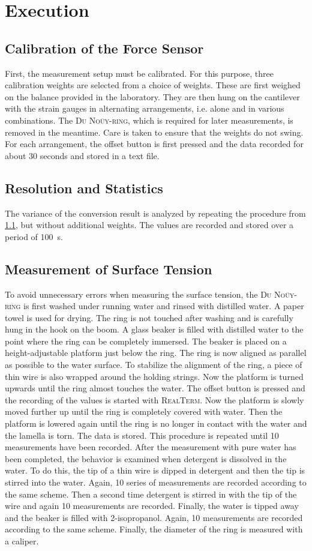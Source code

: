 \chapter{Execution}
\section{Calibration of the Force Sensor} \label{sec:Calibration}
First, the measurement setup must be calibrated. For this purpose, three calibration weights are selected from a choice of weights. These are first weighed on the balance provided in the laboratory. They are then hung on the cantilever with the strain gauges in alternating arrangements, i.e. alone and in various combinations. The \textsc{Du Noüy-ring}, which is required for later measurements, is removed in the meantime. Care is taken to ensure that the weights do not swing. For each arrangement, the offset button is first pressed and the data recorded for about 30 seconds and stored in a text file.
%
\section{Resolution and Statistics} \label{sec:Statistics}
The variance of the conversion result is analyzed by repeating the procedure from \cref{sec:Calibration}, but without additional weights. The values are recorded and stored over a period of \SI{100}{s}.
%
\section{Measurement of Surface Tension} \label{sec:Surface_Tension}
To avoid unnecessary errors when measuring the surface tension, the \textsc{Du Noüy-ring} is first washed under running water and rinsed with distilled water. A paper towel is used for drying. The ring is not touched after washing and is carefully hung in the hook on the boom. A glass beaker is filled with distilled water to the point where the ring can be completely immersed. The beaker is placed on a height-adjustable platform just below the ring. The ring is now aligned as parallel as possible to the water surface. To stabilize the alignment of the ring, a piece of thin wire is also wrapped around the holding strings. Now the platform is turned upwards until the ring almost touches the water. The offset button is pressed and the recording of the values is started with \textsc{RealTerm}. Now the platform is slowly moved further up until the ring is completely covered with water. Then the platform is lowered again until the ring is no longer in contact with the water and the lamella is torn. The data is stored. This procedure is repeated until 10 measurements have been recorded. After the measurement with pure water has been completed, the behavior is examined when detergent is dissolved in the water. To do this, the tip of a thin wire is dipped in detergent and then the tip is stirred into the water. Again, 10 series of measurements are recorded according to the same scheme. Then a second time detergent is stirred in with the tip of the wire and again 10 measurements are recorded. Finally, the water is tipped away and the beaker is filled with 2-isopropanol. Again, 10 measurements are recorded according to the same scheme. Finally, the diameter of the ring is measured with a caliper.

